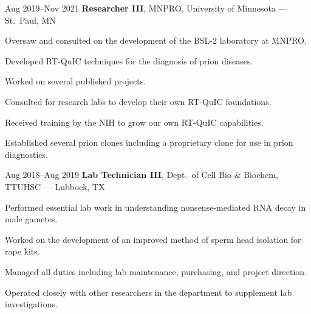 \documentclass{resume}
\begin{document}
        \begin{twocolentry}{Aug 2019--Nov 2021}
            \textbf{Researcher III}, MNPRO, University of Minnesota --- St.\ Paul, MN
        \end{twocolentry}
        \vspace{0.10cm}
        \begin{onecolentry}
            \begin{highlights}
                \item Oversaw and consulted on the development of the BSL-2 laboratory at MNPRO.\
                \item Developed RT-QuIC techniques for the diagnosis of prion diseases.
                \item Worked on several published projects.
                \item Consulted for research labs to develop their own RT-QuIC foundations.
                \item Received training by the NIH to grow our own RT-QuIC capabilities.
                \item Established several prion clones including a proprietary clone for use in prion diagnostics.
            \end{highlights}
        \end{onecolentry}
        \vspace{0.2cm}

        \begin{twocolentry}{Aug 2018--Aug 2019}
            \textbf{Lab Technician III}, Dept.\ of Cell Bio \& Biochem, TTUHSC --- Lubbock, TX
        \end{twocolentry}
        \vspace{0.10cm}
        \begin{onecolentry}
            \begin{highlights}
                \item Performed essential lab work in understanding nonsense-mediated RNA decay in male gametes.
                \item Worked on the development of an improved method of sperm head isolation for rape kits.
                \item Managed all duties including lab maintenance, purchasing, and project direction.
                \item Operated closely with other researchers in the department to supplement lab investigations.
            \end{highlights}
        \end{onecolentry}
        \vspace{0.2cm}
\end{document}
